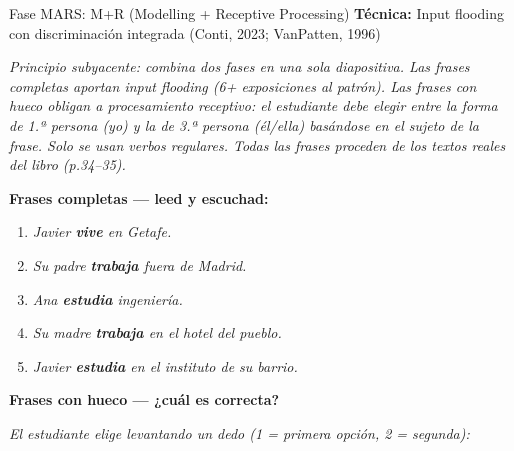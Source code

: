 \documentclass[a4paper,10pt]{article}
\begin{document}
\vspace{0.3cm}

\begin{marsbox}{Fase MARS: M+R (Modelling + Receptive Processing)}
\textbf{Técnica:} Input flooding con discriminación integrada (Conti, 2023; VanPatten, 1996)
\end{marsbox}

\vspace{0.2cm}

{\small\textit{Principio subyacente: combina dos fases en una sola diapositiva. Las frases completas aportan input flooding (6+ exposiciones al patrón). Las frases con hueco obligan a procesamiento receptivo: el estudiante debe elegir entre la forma de 1.ª persona (yo) y la de 3.ª persona (él/ella) basándose en el sujeto de la frase. Solo se usan verbos regulares. Todas las frases proceden de los textos reales del libro (p.34--35).}}

\vspace{0.4cm}

\noindent\textcolor{azulprincipal}{\textbf{\large Frases completas — leed y escuchad:}}

\vspace{0.2cm}

\begin{enumerate}[leftmargin=2em, itemsep=4pt]
\item \textit{Javier \textbf{vive} en Getafe.}
\item \textit{Su padre \textbf{trabaja} fuera de Madrid.}
\item \textit{Ana \textbf{estudia} ingeniería.}
\item \textit{Su madre \textbf{trabaja} en el hotel del pueblo.}
\item \textit{Javier \textbf{estudia} en el instituto de su barrio.}
\end{enumerate}

\vspace{0.4cm}

\noindent\textcolor{azulprincipal}{\textbf{\large Frases con hueco — ¿cuál es correcta?}}

\vspace{0.2cm}

{\small\textit{El estudiante elige levantando un dedo (1 = primera opción, 2 = segunda):}}

\vspace{0.2cm}
\end{document}
